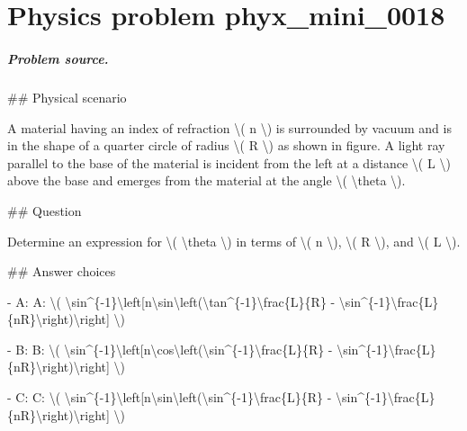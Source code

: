
\chapter{Physics problem phyx\_mini\_0018}
\label{ch:PhyXMiniProblems_problem_phyx_mini_0018}

\paragraph{Problem source.}
\#\# Physical scenario

A material having an index of refraction \textbackslash{}( n \textbackslash{}) is surrounded by vacuum and is in the shape of a quarter circle of radius \textbackslash{}( R \textbackslash{}) as shown in figure. A light ray parallel to the base of the material is incident from the left at a distance \textbackslash{}( L \textbackslash{}) above the base and emerges from the material at the angle \textbackslash{}( \textbackslash{}theta \textbackslash{}).

\#\# Question

Determine an expression for \textbackslash{}( \textbackslash{}theta \textbackslash{}) in terms of \textbackslash{}( n \textbackslash{}), \textbackslash{}( R \textbackslash{}), and \textbackslash{}( L \textbackslash{}).

\#\# Answer choices

- A: A: \textbackslash{}( \textbackslash{}sin\textasciicircum{}\{-1\}\textbackslash{}left[n\textbackslash{}sin\textbackslash{}left(\textbackslash{}tan\textasciicircum{}\{-1\}\textbackslash{}frac\{L\}\{R\} - \textbackslash{}sin\textasciicircum{}\{-1\}\textbackslash{}frac\{L\}\{nR\}\textbackslash{}right)\textbackslash{}right] \textbackslash{})

- B: B: \textbackslash{}( \textbackslash{}sin\textasciicircum{}\{-1\}\textbackslash{}left[n\textbackslash{}cos\textbackslash{}left(\textbackslash{}sin\textasciicircum{}\{-1\}\textbackslash{}frac\{L\}\{R\} - \textbackslash{}sin\textasciicircum{}\{-1\}\textbackslash{}frac\{L\}\{nR\}\textbackslash{}right)\textbackslash{}right] \textbackslash{})

- C: C: \textbackslash{}( \textbackslash{}sin\textasciicircum{}\{-1\}\textbackslash{}left[n\textbackslash{}sin\textbackslash{}left(\textbackslash{}sin\textasciicircum{}\{-1\}\textbackslash{}frac\{L\}\{R\} - \textbackslash{}sin\textasciicircum{}\{-1\}\textbackslash{}frac\{L\}\{nR\}\textbackslash{}right)\textbackslash{}right] \textbackslash{})

